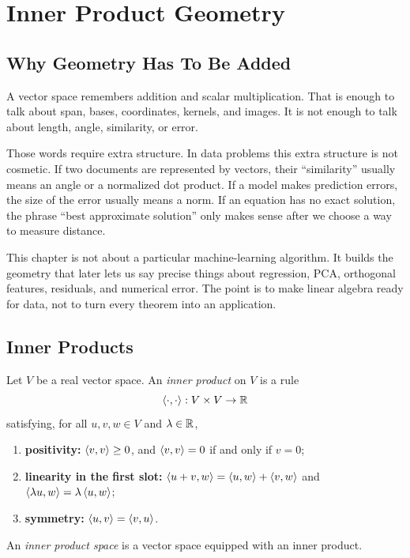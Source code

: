 \chapter{Inner Product Geometry}
\label{ch:inner-product-geometry}

\section{Why Geometry Has To Be Added}

A vector space remembers addition and scalar multiplication. That is enough to
talk about span, bases, coordinates, kernels, and images. It is not enough to
talk about length, angle, similarity, or error.

Those words require extra structure. In data problems this extra structure is
not cosmetic. If two documents are represented by vectors, their ``similarity''
usually means an angle or a normalized dot product. If a model makes prediction
errors, the size of the error usually means a norm. If an equation has no exact
solution, the phrase ``best approximate solution'' only makes sense after we
choose a way to measure distance.

\begin{aimlbox}
This chapter is not about a particular machine-learning algorithm. It builds
the geometry that later lets us say precise things about regression, PCA,
orthogonal features, residuals, and numerical error. The point is to make
linear algebra ready for data, not to turn every theorem into an application.
\end{aimlbox}

\section{Inner Products}

\begin{definition}
Let $V$ be a real vector space. An \emph{inner product} on $V$ is a rule
\[
  \left\langle \cdot,\cdot \right\rangle: V \times V \to \mathbb{R}
\]
satisfying, for all $u,v,w \in V$ and $\lambda \in \mathbb{R}$,
\begin{enumerate}[label=(\alph*)]
  \item \textbf{positivity:} $\left\langle v,v \right\rangle \geq 0$, and
        $\left\langle v,v \right\rangle=0$ if and only if $v=0$;
  \item \textbf{linearity in the first slot:}
        $\left\langle u+v,w \right\rangle=\left\langle u,w \right\rangle+\left\langle v,w \right\rangle$ and
        $\left\langle \lambda u,w \right\rangle=\lambda\left\langle u,w \right\rangle$;
  \item \textbf{symmetry:} $\left\langle u,v \right\rangle=\left\langle v,u \right\rangle$.
\end{enumerate}
An \emph{inner product space} is a vector space equipped with an inner
product.
\end{definition}

